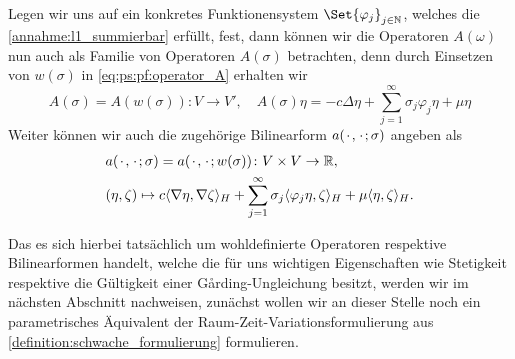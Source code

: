 Legen wir uns auf ein konkretes Funktionensystem $\Set{\varphi_{j}}_{j \in \mathbb{N}}$, welches die \cref{annahme:l1_summierbar} erfüllt, fest, dann können wir die Operatoren $A(\omega)$ nun auch als Familie von Operatoren $A(\sigma)$ betrachten, denn durch Einsetzen von $w(\sigma)$ in \cref{eq:ps:pf:operator_A} erhalten wir
\begin{equation}
\label{eq:ps:pf:operator_A_sigma}
    A(\sigma) = A(w(\sigma)) \colon V \to V', \quad A(\sigma) \eta = -c \Delta \eta + \sum_{j = 1}^{\infty} \sigma_{j} \varphi_{j} \eta + \mu \eta
\end{equation}
Weiter können wir auch die zugehörige Bilinearform $a({\mkern2mu\cdot\mkern2mu}, {\mkern2mu\cdot\mkern2mu}; \sigma)$ angeben als
\begin{equation}
\label{eq:ps:pf:bilinearform_a_sigma}
    \begin{aligned}
    &a({\mkern2mu\cdot\mkern2mu}, {\mkern2mu\cdot\mkern2mu}; \sigma) = a({\mkern2mu\cdot\mkern2mu}, {\mkern2mu\cdot\mkern2mu}; w(\sigma)) \colon V \times V \to \mathbb{R}, \\
    &(\eta, \zeta) \mapsto c\langle\nabla \eta,\nabla \zeta\rangle_{H} + \sum_{j = 1}^{\infty} \sigma_{j} \langle\varphi_{j} \eta,\zeta\rangle_{H} + \mu \langle\eta,\zeta\rangle_{H}.
    \end{aligned}
\end{equation}

Das es sich hierbei tatsächlich um wohldefinierte Operatoren respektive Bilinearformen handelt, welche die für uns wichtigen Eigenschaften wie Stetigkeit respektive die Gültigkeit einer G\aa{}rding-Ungleichung besitzt, werden wir im nächsten Abschnitt nachweisen, zunächst wollen wir an dieser Stelle noch ein parametrisches Äquivalent der Raum-Zeit-Variationsformulierung aus \cref{definition:schwache_formulierung} formulieren.

